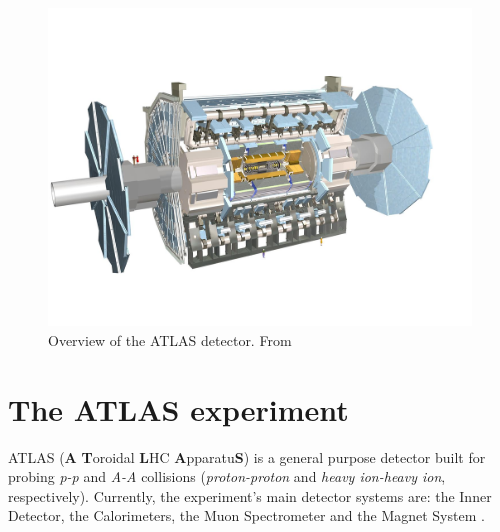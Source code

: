 \begin{figure}[!ht]
    \centering
    \includegraphics[width=.7\textwidth]{Images/intro/ATLAS_detector.jpg}
    \captionsetup{width=.8\linewidth}
    \caption{Overview of the ATLAS detector. From \cite{atlasDetectorTechnology}}
    \label{fig:ATLAS}
\end{figure}


\section{The ATLAS experiment}%

ATLAS (\textbf{A} \textbf{T}oroidal \textbf{L}HC \textbf{A}pparatu\textbf{S}) is a general purpose detector built for probing \textit{p-p} and \textit{A-A} collisions (\textit{proton-proton} and \textit{heavy ion-heavy ion}, respectively). Currently, the experiment's main detector systems are: the Inner Detector, the Calorimeters, the Muon Spectrometer and the Magnet System \cite{Collaboration_The_ATLAS2008}. 

\begin{figure}[hb]
    \centering
    \hfill
    \centering
\end{figure}


